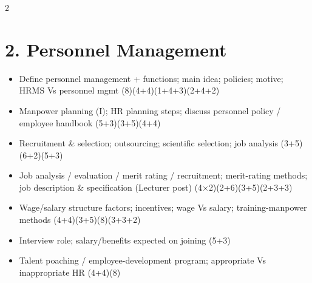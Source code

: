 \documentclass[10pt]{article}
\begin{document}
\begin{multicols}{2}
\section*{2. Personnel Management}
\begin{itemize}
  \item Define personnel management + functions; main idea; policies; motive; HRMS Vs personnel mgmt \hfill (8)(4+4)(1+4+3)(2+4+2)
  \item Manpower planning (I); HR planning steps; discuss personnel policy / employee handbook \hfill (5+3)(3+5)(4+4)
  \item Recruitment \& selection; outsourcing; scientific selection; job analysis \hfill (3+5)(6+2)(5+3)
  \item Job analysis / evaluation / merit rating / recruitment; merit-rating methods; job description \& specification (Lecturer post) \hfill (4$\times$2)(2+6)(3+5)(2+3+3)
  \item Wage/salary structure factors; incentives; wage Vs salary; training-manpower methods \hfill (4+4)(3+5)(8)(3+3+2)
  \item Interview role; salary/benefits expected on joining \hfill (5+3)
  \item Talent poaching / employee-development program; appropriate Vs inappropriate HR \hfill (4+4)(8)
\end{itemize}


\end{multicols}
\end{document}
